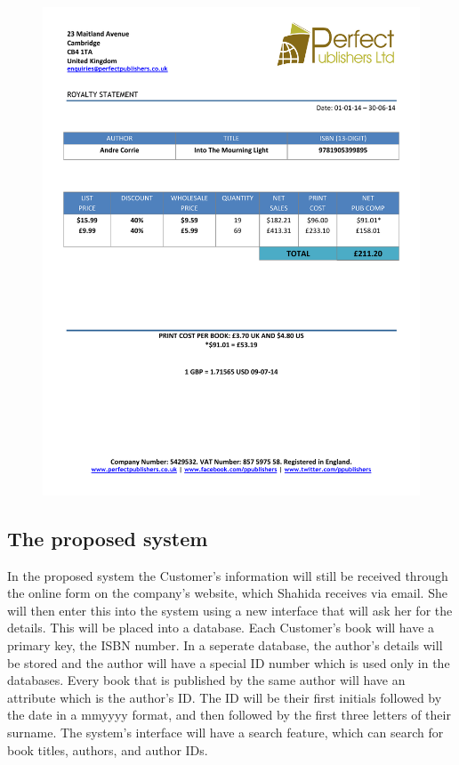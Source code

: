 \begin{figure}[H]
    \includegraphics[width=\textwidth]{./Analysis/Royalty Statement Example.pdf}
\end{figure}

\subsection{The proposed system}

In the proposed system the Customer's information will still be received through the online form on the company's website, which Shahida receives via email. She will then enter this into the system using a new interface that will ask her for the details. This will be placed into a database. Each Customer's book will have a primary key, the ISBN number. In a seperate database, the author's details will be stored and the author will have a special ID number which is used only in the databases. Every book that is published by the same author will have an attribute which is the author's ID. The ID will be their first initials followed by the date in a mmyyyy format, and then followed by the first three letters of their surname. The system's interface will have a search feature, which can search for book titles, authors, and author IDs.


